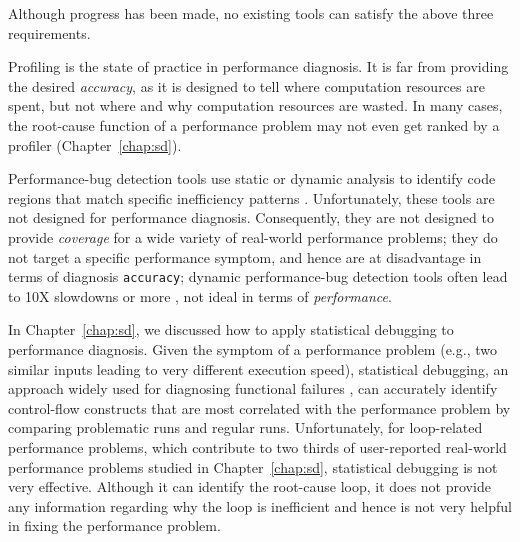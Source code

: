 Although progress has been made, no existing tools can satisfy the above
three requirements.

Profiling is the state of practice in performance diagnosis.
It is far from providing the desired \textit{accuracy}, as it is designed to
tell where computation resources are spent, 
but not where and why computation resources are wasted. 
In many cases, the root-cause function of a performance problem may not even
get ranked by a profiler (Chapter~\ref{chap:sd}).


Performance-bug detection tools use static or dynamic analysis to identify
code regions that match specific inefficiency patterns 
\citep{Alabama,CARAMEL, Cachetor,XuDataStructure,BloatFSE2008, XuBloatPLDI2009, XuBloatPLDI2010}. 
Unfortunately, these tools are not designed for performance diagnosis.
Consequently, they are not designed to provide \textit{coverage} for a wide
variety of real-world performance problems; they do not target a specific
performance symptom, and hence are at disadvantage in terms of diagnosis
\texttt{accuracy}; dynamic performance-bug detection tools often lead to 
10X slowdowns or more \citep{Cachetor,XuBloatPLDI2010,Alabama}, 
not ideal in terms of \textit{performance}.



In Chapter~\ref{chap:sd}, we discussed how to apply statistical debugging to performance diagnosis. 
Given the symptom of 
a performance problem (e.g., two similar inputs leading to very
different execution speed),
statistical debugging, an approach widely used for diagnosing
functional failures \citep{liblit03,liblit05,tarantula1}, can
accurately identify control-flow constructs that are most correlated with
the performance problem by comparing problematic runs and regular runs.
Unfortunately, for loop-related 
performance problems, which contribute to two thirds of user-reported
real-world performance problems studied in Chapter~\ref{chap:sd},
statistical debugging is not very effective.
Although it can identify the root-cause loop, it does not provide any 
information regarding why the loop is inefficient and hence is not very helpful
in fixing the performance problem.



